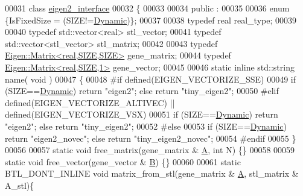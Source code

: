 \begin{DoxyCode}
00031 \textcolor{keyword}{class }\hyperlink{classeigen2__interface}{eigen2\_interface}
00032 \{
00033 
00034 public :
00035 
00036   \textcolor{keyword}{enum} \{IsFixedSize = (SIZE!=\hyperlink{namespace_eigen_ad81fa7195215a0ce30017dfac309f0b2}{Dynamic})\};
00037 
00038   \textcolor{keyword}{typedef} real real\_type;
00039 
00040   \textcolor{keyword}{typedef} std::vector<real> stl\_vector;
00041   \textcolor{keyword}{typedef} std::vector<stl\_vector> stl\_matrix;
00042 
00043   \textcolor{keyword}{typedef} \hyperlink{group___core___module_class_eigen_1_1_matrix}{Eigen::Matrix<real,SIZE,SIZE>} gene\_matrix;
00044   \textcolor{keyword}{typedef} \hyperlink{group___core___module_class_eigen_1_1_matrix}{Eigen::Matrix<real,SIZE,1>} gene\_vector;
00045 
00046   \textcolor{keyword}{static} \textcolor{keyword}{inline} std::string name( \textcolor{keywordtype}{void} )
00047   \{
00048 \textcolor{preprocessor}{    #if defined(EIGEN\_VECTORIZE\_SSE)}
00049     \textcolor{keywordflow}{if} (SIZE==\hyperlink{namespace_eigen_ad81fa7195215a0ce30017dfac309f0b2}{Dynamic}) \textcolor{keywordflow}{return} \textcolor{stringliteral}{"eigen2"}; \textcolor{keywordflow}{else} \textcolor{keywordflow}{return} \textcolor{stringliteral}{"tiny\_eigen2"};
00050 \textcolor{preprocessor}{    #elif defined(EIGEN\_VECTORIZE\_ALTIVEC) || defined(EIGEN\_VECTORIZE\_VSX)}
00051     \textcolor{keywordflow}{if} (SIZE==\hyperlink{namespace_eigen_ad81fa7195215a0ce30017dfac309f0b2}{Dynamic}) \textcolor{keywordflow}{return} \textcolor{stringliteral}{"eigen2"}; \textcolor{keywordflow}{else} \textcolor{keywordflow}{return} \textcolor{stringliteral}{"tiny\_eigen2"};
00052 \textcolor{preprocessor}{    #else}
00053     \textcolor{keywordflow}{if} (SIZE==\hyperlink{namespace_eigen_ad81fa7195215a0ce30017dfac309f0b2}{Dynamic}) \textcolor{keywordflow}{return} \textcolor{stringliteral}{"eigen2\_novec"}; \textcolor{keywordflow}{else} \textcolor{keywordflow}{return} \textcolor{stringliteral}{"tiny\_eigen2\_novec"};
00054 \textcolor{preprocessor}{    #endif}
00055   \}
00056 
00057   \textcolor{keyword}{static} \textcolor{keywordtype}{void} free\_matrix(gene\_matrix & \hyperlink{group___core___module_class_eigen_1_1_matrix}{A}, \textcolor{keywordtype}{int} N) \{\}
00058 
00059   \textcolor{keyword}{static} \textcolor{keywordtype}{void} free\_vector(gene\_vector & \hyperlink{group___core___module_class_eigen_1_1_matrix}{B}) \{\}
00060 
00061   \textcolor{keyword}{static} BTL\_DONT\_INLINE \textcolor{keywordtype}{void} matrix\_from\_stl(gene\_matrix & \hyperlink{group___core___module_class_eigen_1_1_matrix}{A}, stl\_matrix & A\_stl)\{

\end{DoxyCode}
